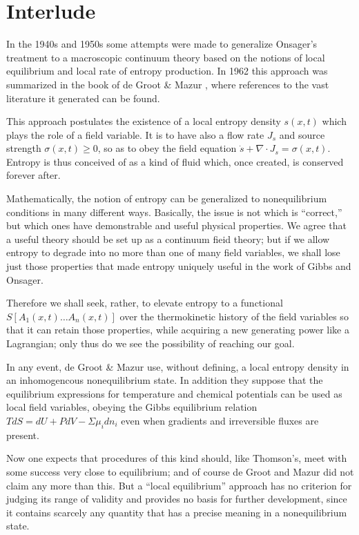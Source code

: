 \documentclass{article}
\begin{document}
\section{Interlude}

In the 1940s and 1950s some attempts were made to generalize Onsager's treatment to a macroscopic continuum theory based on the notions of local equilibrium and local rate of entropy production. In 1962 this approach was summarized in the book of de Groot \& Mazur \cite{degroot1962}, where references to the vast literature it generated can be found.

This approach postulates the existence of a local entropy density $s(x, t)$ which plays the role of a field variable. It is to have also a flow rate $J_s$ and source strength $\sigma(x, t) \geqslant 0$, so as to obey the field equation $\dot{s}+\nabla \cdot J_s=\sigma(x, t)$. Entropy is thus conceived of as a kind of fluid which, once created, is conserved forever after.

Mathematically, the notion of entropy can be generalized to nonequilibrium conditions in many different ways. Basically, the issue is not which is ``correct,'' but which ones have demonstrable and useful physical properties. We agree that a useful theory should be set up as a continuum fieid theory; but if we allow entropy to degrade into no more than one of many field variables, we shall lose just those properties that made entropy uniquely useful in the work of Gibbs and Onsager.

Therefore we shall seek, rather, to elevate entropy to a functional $S\left[A_1(x, t) \ldots A_n(x, t)\right]$ over the thermokinetic history of the field variables so that it can retain those properties, while acquiring a new generating power like a Lagrangian; only thus do we see the possibility of reaching our goal.

In any event, de Groot \& Mazur use, without defining, a local entropy density in an inhomogencous nonequilibrium state. In addition they suppose that the equilibrium expressions for temperature and chemical potentials can be used as local field variables, obeying the Gibbs equilibrium relation $T d S=d U+P d V-\Sigma \mu_i d n_i$ even when gradients and irreversible fluxes are present.

Now one expects that procedures of this kind should, like Thomson's, meet with some success very close to equilibrium; and of course de Groot and Mazur did not claim any more than this. But a ``local equilibrium'' approach has no criterion for judging its range of validity and provides no basis for further development, since it contains scarcely any quantity that has a precise meaning in a nonequilibrium state.
\end{document}
